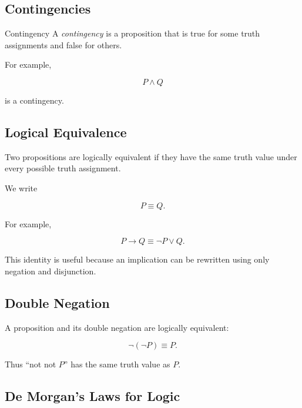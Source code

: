 \subsection{Contingencies}
\label{subsec:contingencies}

\begin{definitionbox}{Contingency}
A \emph{contingency} is a proposition that is true for some truth assignments
and false for others.
\end{definitionbox}

For example,

\[ P\land Q \]

is a contingency.

\subsection{Logical Equivalence}
\label{subsec:logical-equivalence}

Two propositions are logically equivalent if they have the same truth value
under every possible truth assignment.

We write

\[ P\equiv Q. \]

For example,

\[ P\to Q\equiv\neg P\lor Q. \]

This identity is useful because an implication can be rewritten using only
negation and disjunction.

\subsection{Double Negation}
\label{subsec:double-negation}

A proposition and its double negation are logically equivalent:

\[ \neg(\neg P)\equiv P. \]

Thus ``not not \(P\)'' has the same truth value as \(P\).

\subsection{De Morgan's Laws for Logic}
\label{subsec:de-morgan-logic}

